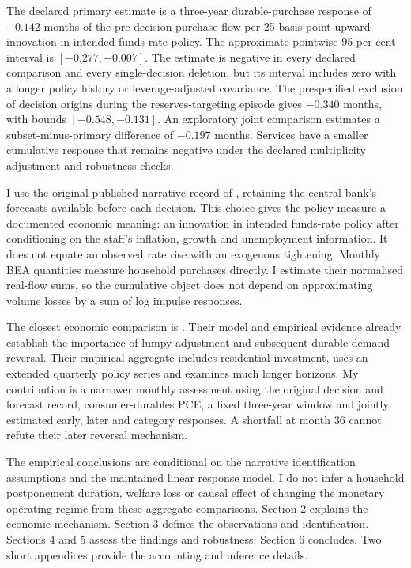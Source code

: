 \documentclass[11pt,a4paper]{article}
\begin{document}
The declared primary estimate is a three-year durable-purchase response of $-0.142$ months of the pre-decision purchase flow per 25-basis-point upward innovation in intended funds-rate policy. The approximate pointwise 95 per cent interval is $[-0.277,-0.007]$. The estimate is negative in every declared comparison and every single-decision deletion, but its interval includes zero with a longer policy history or leverage-adjusted covariance. The prespecified exclusion of decision origins during the reserves-targeting episode gives $-0.340$ months, with bounds $[-0.548,-0.131]$. An exploratory joint comparison estimates a subset-minus-primary difference of $-0.197$ months. Services have a smaller cumulative response that remains negative under the declared multiplicity adjustment and robustness checks.

I use the original published narrative record of \citet{RomerRomer2004}, retaining the central bank's forecasts available before each decision. This choice gives the policy measure a documented economic meaning: an innovation in intended funds-rate policy after conditioning on the staff's inflation, growth and unemployment information. It does not equate an observed rate rise with an exogenous tightening. Monthly BEA quantities measure household purchases directly. I estimate their normalised real-flow sums, so the cumulative object does not depend on approximating volume losses by a sum of log impulse responses.

The closest economic comparison is \citet{McKayWieland2021}. Their model and empirical evidence already establish the importance of lumpy adjustment and subsequent durable-demand reversal. Their empirical aggregate includes residential investment, uses an extended quarterly policy series and examines much longer horizons. My contribution is a narrower monthly assessment using the original decision and forecast record, consumer-durables PCE, a fixed three-year window and jointly estimated early, later and category responses. A shortfall at month 36 cannot refute their later reversal mechanism.

The empirical conclusions are conditional on the narrative identification assumptions and the maintained linear response model. I do not infer a household postponement duration, welfare loss or causal effect of changing the monetary operating regime from these aggregate comparisons. Section 2 explains the economic mechanism. Section 3 defines the observations and identification. Sections 4 and 5 assess the findings and robustness; Section 6 concludes. Two short appendices provide the accounting and inference details.
\end{document}
